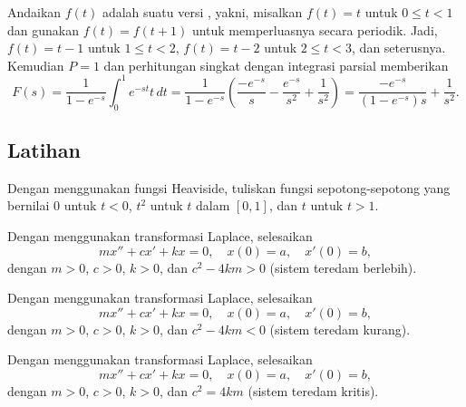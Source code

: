 \begin{example}
Andaikan $f(t)$ adalah suatu versi \emph{}, yakni,
misalkan
$f(t) = t$ untuk $0 \leq t < 1$
dan gunakan $f(t)=f(t+1)$ untuk memperluasnya secara periodik.  Jadi,
$f(t) = t-1$ untuk $1 \leq t < 2$, 
$f(t) = t-2$ untuk $2 \leq t < 3$, dan seterusnya.  Kemudian $P=1$ dan
perhitungan singkat dengan integrasi parsial memberikan
\begin{equation*}
F(s) =
\frac{1}{1-e^{-s}}
\int_0^1 e^{-st} t \, dt 
=
\frac{1}{1-e^{-s}}
\left(
\frac{-e^{-s}}{s}-\frac{e^{-s}}{s^2} + \frac{1}{s^2}
\right)
=
\frac{-e^{-s}}{(1-e^{-s})s} + \frac{1}{s^2} .
\end{equation*}
\end{example}

\subsection{Latihan}

\begin{exercise}
Dengan menggunakan fungsi Heaviside, tuliskan fungsi sepotong-sepotong
yang bernilai 0 untuk $t < 0$, $t^2$ untuk $t$ dalam $[0,1]$, dan $t$ untuk $t > 1$.
\end{exercise}

\begin{exercise}
Dengan menggunakan transformasi Laplace, selesaikan
\begin{equation*}
m x'' + c x' + k x = 0 , \quad x(0) = a, \quad x'(0) = b ,
\end{equation*}
dengan $m > 0$, $c > 0$, $k > 0$, dan
$c^2 - 4km > 0$ (sistem teredam berlebih).
\end{exercise}

\begin{exercise}
Dengan menggunakan transformasi Laplace, selesaikan
\begin{equation*}
m x'' + c x' + k x = 0 , \quad x(0) = a, \quad x'(0) = b ,
\end{equation*}
dengan $m > 0$, $c > 0$, $k > 0$, dan
$c^2 - 4km < 0$ (sistem teredam kurang).
\end{exercise}

\begin{exercise}
Dengan menggunakan transformasi Laplace, selesaikan
\begin{equation*}
m x'' + c x' + k x = 0 , \quad x(0) = a, \quad x'(0) = b ,
\end{equation*}
dengan $m > 0$, $c > 0$, $k > 0$, dan
$c^2 = 4km$ (sistem teredam kritis).
\end{exercise}

